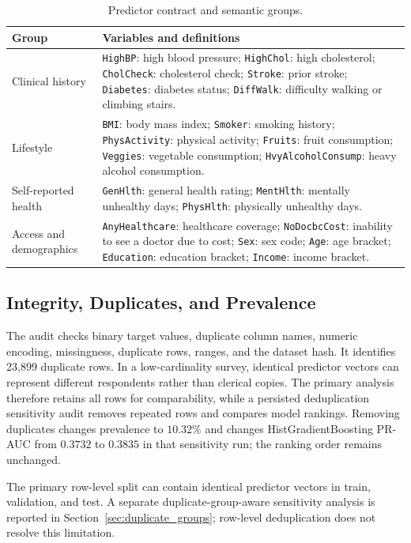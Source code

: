 \documentclass[conference,10pt]{IEEEtran}
\begin{document}
\begin{table}[t]
\centering
\caption{Predictor contract and semantic groups.}
\label{tab:predictors}
\scriptsize
\begin{tabular}{p{}p{}}
\toprule
\textbf{Group} & \textbf{Variables and definitions}\\
\midrule
Clinical history & \texttt{HighBP}: high blood pressure; \texttt{HighChol}: high cholesterol; \texttt{CholCheck}: cholesterol check; \texttt{Stroke}: prior stroke; \texttt{Diabetes}: diabetes status; \texttt{DiffWalk}: difficulty walking or climbing stairs.\\
Lifestyle & \texttt{BMI}: body mass index; \texttt{Smoker}: smoking history; \texttt{PhysActivity}: physical activity; \texttt{Fruits}: fruit consumption; \texttt{Veggies}: vegetable consumption; \texttt{HvyAlcoholConsump}: heavy alcohol consumption.\\
Self-reported health & \texttt{GenHlth}: general health rating; \texttt{MentHlth}: mentally unhealthy days; \texttt{PhysHlth}: physically unhealthy days.\\
Access and demographics & \texttt{AnyHealthcare}: healthcare coverage; \texttt{NoDocbcCost}: inability to see a doctor due to cost; \texttt{Sex}: sex code; \texttt{Age}: age bracket; \texttt{Education}: education bracket; \texttt{Income}: income bracket.\\
\bottomrule
\end{tabular}
\end{table}

\subsection{Integrity, Duplicates, and Prevalence}
The audit checks binary target values, duplicate column names, numeric encoding, missingness, duplicate rows, ranges, and the dataset hash. It identifies 23,899 duplicate rows. In a low-cardinality survey, identical predictor vectors can represent different respondents rather than clerical copies. The primary analysis therefore retains all rows for comparability, while a persisted deduplication sensitivity audit removes repeated rows and compares model rankings. Removing duplicates changes prevalence to $10.32\%$ and changes HistGradientBoosting PR-AUC from $0.3732$ to $0.3835$ in that sensitivity run; the ranking order remains unchanged.

The primary row-level split can contain identical predictor vectors in train, validation, and test. A separate duplicate-group-aware sensitivity analysis is reported in Section~\ref{sec:duplicate_groups}; row-level deduplication does not resolve this limitation.
\end{document}

